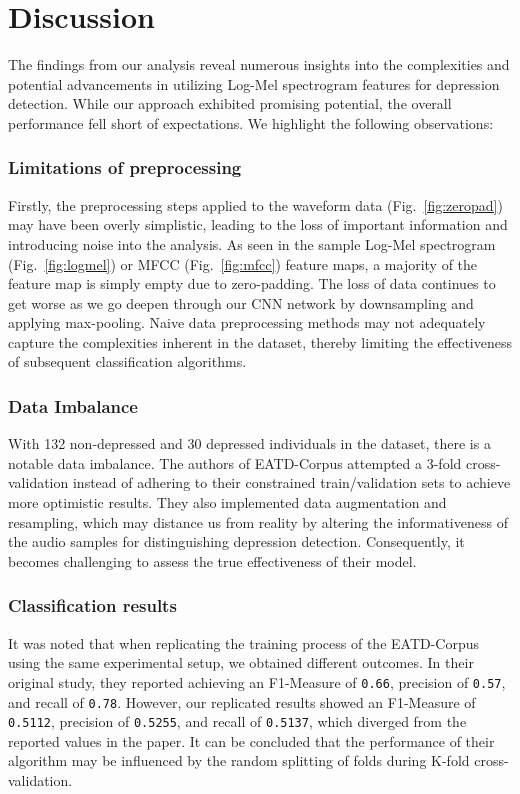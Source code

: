
\section{Discussion}\label{sec:discussion}

The findings from our analysis reveal numerous insights into the complexities and potential advancements in utilizing Log-Mel spectrogram features for depression detection. While our approach exhibited promising potential, the overall performance fell short of expectations. We highlight the following observations:

\subsubsection{Limitations of preprocessing}

Firstly, the preprocessing steps applied to the waveform data (Fig.~\ref{fig:zeropad}) may have been overly simplistic, leading to the loss of important information and introducing noise into the analysis. As seen in the sample Log-Mel spectrogram (Fig.~\ref{fig:logmel}) or MFCC (Fig.~\ref{fig:mfcc}) feature maps, a majority of the feature map is simply empty due to zero-padding. The loss of data continues to get worse as we go deepen through our CNN network by downsampling and applying max-pooling. Naive data preprocessing methods may not adequately capture the complexities inherent in the dataset, thereby limiting the effectiveness of subsequent classification algorithms.

\subsubsection{Data Imbalance}

With 132 non-depressed and 30 depressed individuals in the dataset, there is a notable data imbalance. The authors of EATD-Corpus attempted a 3-fold cross-validation instead of adhering to their constrained train/validation sets to achieve more optimistic results. They also implemented data augmentation and resampling, which may distance us from reality by altering the informativeness of the audio samples for distinguishing depression detection. Consequently, it becomes challenging to assess the true effectiveness of their model.

\subsubsection{Classification results}

It was noted that when replicating the training process of the EATD-Corpus using the same experimental setup, we obtained different outcomes. In their original study, they reported achieving an F1-Measure of \texttt{0.66}, precision of \texttt{0.57}, and recall of \texttt{0.78}. However, our replicated results showed an F1-Measure of \texttt{0.5112}, precision of \texttt{0.5255}, and recall of \texttt{0.5137}, which diverged from the reported values in the paper. It can be concluded that the performance of their algorithm may be influenced by the random splitting of folds during K-fold cross-validation.
